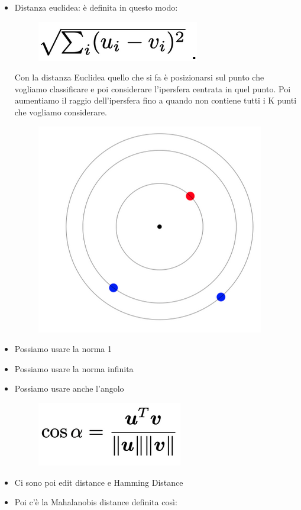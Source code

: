 \documentclass[14pt]{extreport}
\begin{document}
\begin{itemize}
	\item Distanza euclidea: è definita in questo modo:

	      \begin{figure}[H]
		      \centering
		      \includegraphics[width=0.7\linewidth]{463.jpeg}
	      \end{figure}
	      Con la distanza Euclidea quello che si fa è posizionarsi sul punto che vogliamo classificare e poi considerare l’ipersfera centrata in quel
	      punto. Poi aumentiamo il raggio dell’ipersfera fino a quando non contiene tutti i K punti che vogliamo considerare.

	      \begin{figure}[H]
		      \centering
		      \includegraphics[width=0.7\linewidth]{466.jpeg}
	      \end{figure}
	\item 	Possiamo usare la norma 1
	\item Possiamo usare la norma infinita
	\item Possiamo usare anche l’angolo

	      \begin{figure}[H]
		      \centering
		      \includegraphics[width=0.7\linewidth]{465.jpeg}
	      \end{figure}
	\item Ci sono poi edit distance e Hamming Distance
	\item Poi c’è la Mahalanobis distance definita così:


\end{itemize}
\end{document}
